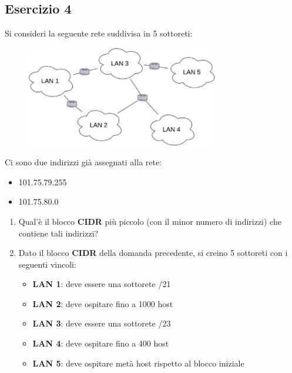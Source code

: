 \documentclass[a4paper]{article}
\begin{document}
\subsection{Esercizio 4}
Si consideri la seguente rete suddivisa in 5 sottoreti:
\begin{figure}[H]
  \centering
  \includegraphics[width=0.75\textwidth]{../figures/esercitazione-es1}
\end{figure}

\noindent
Ci sono due indirizzi già assegnati alla rete:
\begin{itemize}
  \item 101.75.79.255
  \item 101.75.80.0
\end{itemize}

\begin{enumerate}
  \item Qual'è il blocco \textbf{CIDR} più piccolo (con il minor numero di indirizzi) che
    contiene tali indirizzi?
  \item Dato il blocco \textbf{CIDR} della domanda precedente, si creino 5 sottoreti con
    i seguenti vincoli:
\begin{itemize}
  \item \textbf{LAN 1}: deve essere una sottorete /21

  \item \textbf{LAN 2}: deve ospitare fino a 1000 host

  \item \textbf{LAN 3}: deve essere una sottorete /23
  \item \textbf{LAN 4}: deve ospitare fino a 400 host

  \item \textbf{LAN 5}: deve ospitare metà host rispetto al blocco iniziale
\end{itemize}
\end{enumerate}
\end{document}
